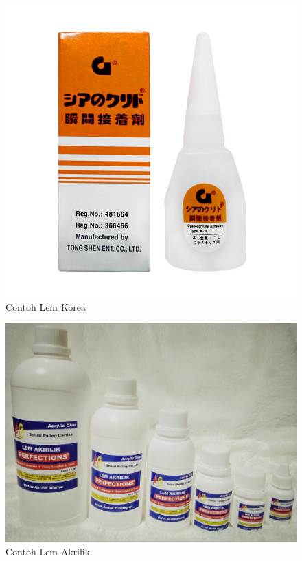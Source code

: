 \begin{enumerate}
\begin{figure}[H]
\centering
\includegraphics[width=1\textwidth]{figures/lem.jpg}
\caption{Contoh Lem Korea}
\label{print}
\end{figure}

\begin{figure}[H]
\centering
\includegraphics[width=1\textwidth]{figures/lem3.jpg}
\caption{Contoh Lem Akrilik}
\label{print}
\end{figure}


\end{enumerate}
